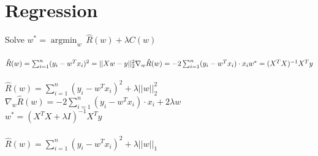 
\section*{Regression}
Solve $w^* = {\operatorname{argmin}}_w ~ \hat{R}(w)+ \lambda C(w)$\\
\\
$\hat{R}(w) = \sum_{i=1}^n (y_i - w^Tx_i)^2 = ||Xw-y||^2_2\\
\nabla_w \hat{R}(w) = -2 \sum_{i=1}^n (y_i-w^T x_i) \cdot x_i \\
w^* = (X^T X)^{-1} X^T y$\\
\\
$\hat{R}(w) = \sum_{i=1}^n (y_i - w^Tx_i)^2 + \lambda ||w||_2^2$\\
$\nabla_w \hat{R}(w) = -2 \sum_{i=1}^n (y_i-w^T x_i) \cdot x_i + 2 \lambda w$\\
$w^*=(X^T X + \lambda I)^{-1} X^T y$\\
\\
$\hat{R}(w) = \sum_{i=1}^n (y_i - w^Tx_i)^2 + \lambda ||w||_1$